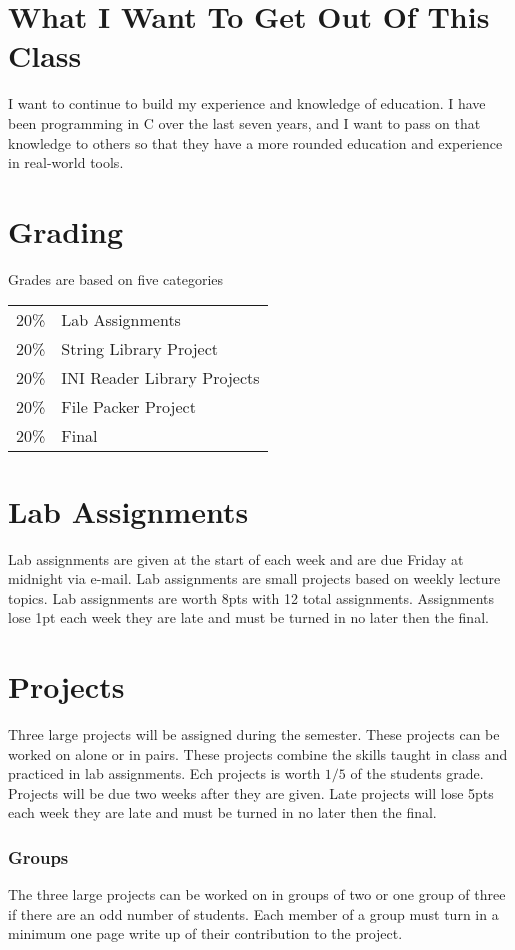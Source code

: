\documentclass[a4paper,12pt]{report}
\begin{document}
\section*{What I Want To Get Out Of This Class}
I want to continue to build my experience and knowledge of education.  I have been programming in C over the last seven years, and I want to pass on that knowledge to others so that they have a more rounded education and experience in real-world tools. 


\section*{Grading}
Grades are based on five categories

\begin{tabular}{l l}
20\% & Lab Assignments \\
20\% & String Library Project \\
20\% & INI Reader Library Projects \\
20\% & File Packer Project \\
20\% & Final 
\end{tabular}

\section*{Lab Assignments}
Lab assignments are given at the start of each week and are due Friday at midnight via e-mail.  Lab assignments are small projects based on weekly lecture topics.  Lab assignments are worth 8pts with 12 total assignments.  Assignments lose 1pt each week they are late and must be turned in no later then the final.

\section*{Projects}
Three large projects will be assigned during the semester. These projects can be worked on alone or in pairs.  These projects combine the skills taught in class and practiced in lab assignments.  Ech projects is worth $1/5$ of the students grade.  Projects will be due two weeks after they are given.  Late projects will lose 5pts each week they are late and must be turned in no later then the final.
\subsubsection*{Groups}
The three large projects can be worked on in groups of two or one group of three if there are an odd number of students.  Each member of a group must turn in a minimum one page write up of their contribution to the project.
\end{document}
